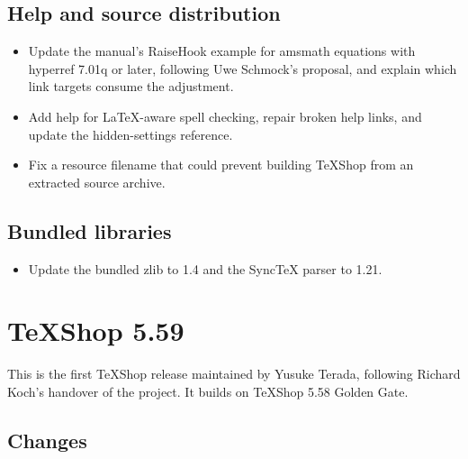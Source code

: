 \documentclass[11pt,letterpaper]{article}
\begin{document}
\subsection{Help and source distribution}

\begin{itemize}
\item Update the manual’s RaiseHook example for amsmath equations with hyperref 7.01q or later, following Uwe Schmock’s proposal, and explain which link targets consume the adjustment.
\item Add help for LaTeX-aware spell checking, repair broken help links, and update the hidden-settings reference.
\item Fix a resource filename that could prevent building TeXShop from an extracted source archive.
\end{itemize}

\subsection{Bundled libraries}

\begin{itemize}
\item Update the bundled zlib to 1.4 and the SyncTeX parser to 1.21.
\end{itemize}
\clearpage
\section{TeXShop 5.59}

This is the first TeXShop release maintained by Yusuke Terada, following Richard Koch's handover of the project. It builds on TeXShop 5.58 Golden Gate.


\subsection{Changes}
\end{document}
